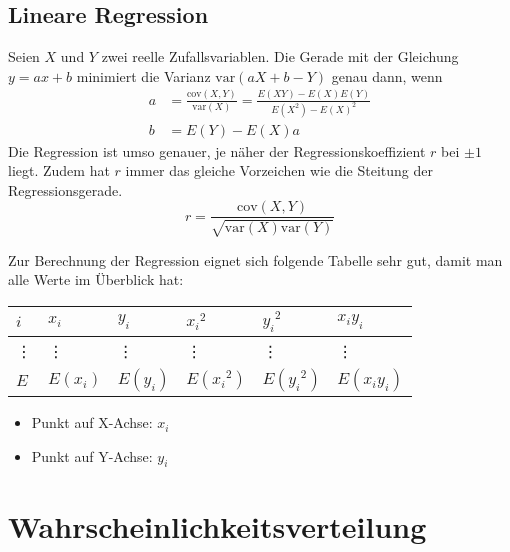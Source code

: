 \subsection{Lineare Regression}
Seien $X$ und $Y$ zwei reelle Zufallsvariablen. Die Gerade mit der
Gleichung $y = ax + b$ minimiert die Varianz $\text{var}(aX + b -Y)$
genau dann, wenn
\begin{align*}
  a & = \frac{\text{cov}(X,Y)}{\text{var}(X)} = \frac{E(XY)
        - E(X)E(Y)}{E(X^2) - E(X)^2} \\
  b & = E(Y) - E(X)a
\end{align*}
Die Regression ist umso genauer, je näher der Regressionskoeffizient $r$
bei $\pm 1$ liegt. Zudem hat $r$ immer das gleiche Vorzeichen wie die
Steitung der Regressionsgerade.
\[ r = \frac{\text{cov}(X,Y)}{\sqrt{\text{var}(X)\text{var}(Y)}} \]

Zur Berechnung der Regression eignet sich folgende Tabelle sehr gut,
damit man alle Werte im Überblick hat:

\begin{tabular}{|l|l|l|l|l|l|}
  \hline
  $i$    & $x_i$    & $y_i$    & ${x_i}^2$    & ${y_i}^2$  & $x_iy_i$ \\
  \hline
  \vdots & \vdots   & \vdots   & \vdots       & \vdots       & \vdots \\
  \hline
  $E$ & $E(x_i)$ & $E(y_i)$ & $E({x_i}^2)$ & $E({y_i}^2)$ & $E(x_iy_i)$ \\
  \hline
\end{tabular}
\begin{itemize}
  \item Punkt auf X-Achse: $x_i$
  \item Punkt auf Y-Achse: $y_i$
\end{itemize}

\section{Wahrscheinlichkeitsverteilung}
